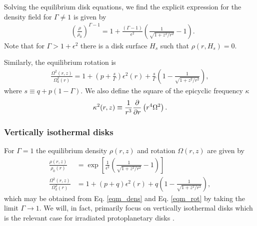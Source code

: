 Solving the equilibrium disk equations, we find the explicit
expression for the density field for 
$\Gamma\neq1$ is given  by
\begin{align}\label{eqm_dens}
  &\left(\frac{\rho}{\rho_0}\right)^{\Gamma-1} = 1 +
  \frac{\left(\Gamma-1\right)}{\epsilon^2}\left(\frac{1}{\sqrt{1+z^2/r^2}}-1\right).
\end{align}
Note that for $\Gamma > 1 + \epsilon^2$ there is a disk surface $H_s$
such that $\rho(r,H_s)=0$. 

Similarly, the equilibrium rotation is 
\begin{align}\label{eqm_rot}
  \frac{\Omega^2(r,z)}{\Omega_k^2(r)}=1 +
  \left(p+\frac{s}{\Gamma}\right)\epsilon^2(r) 
  +\frac{s}{\Gamma} \left(1-\frac{1}{\sqrt{1+z^2/r^2}}\right), 
\end{align}
where $s\equiv q+p(1-\Gamma)$. We also define %
the square of the epicyclic frequency $\kappa$ 
\begin{align}
  \kappa^2(r,z) \equiv \frac{1}{r^3}\frac{\p }{\p
    r}\left(r^4\Omega^2\right). %
\end{align}


\subsubsection{Vertically isothermal disks}
For $\Gamma=1$ the equilibrium density $\rho(r,z)$ and rotation
$\Omega(r,z)$ are given by 
\begin{align}
  \frac{\rho(r,z)}{\rho_0(r)} &=
  \exp{\left[\frac{1}{\epsilon^2}\left(\frac{1}{\sqrt{1+z^2/r^2}}-1\right)\right]}\\    
  \frac{\Omega^2(r,z)}{\Omega_k^2(r)}& =1+ (p+q)\epsilon^2(r) + q\left(1 -
    \frac{1}{\sqrt{1+z^2/r^2}}\right),\label{vertiso_eqm}
\end{align}
which may be obtained from Eq. \ref{eqm_dens} and Eq. \ref{eqm_rot} by
taking the limit $\Gamma\to 1$. We will, in fact, primarily focus on
vertically isothermal disks which is the relevant case for irradiated
protoplanetary disks \citep{chiang97}. 


